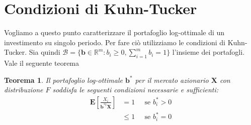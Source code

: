 \documentclass[a4paper,11pt]{book}
\theoremstyle{plain}
\newtheorem{teo}{Teorema}[chapter]
\theoremstyle{definition}
\theoremstyle{remark}
\newcommand{\R}{\mathbb{R}}
\newcommand{\X}{\bm{X}}
\newcommand{\B}{\bm{b}}
\begin{document}
\section{Condizioni di Kuhn-Tucker}
Vogliamo a questo punto caratterizzare il portafoglio log-ottimale di un investimento su singolo periodo. Per fare ciò utilizziamo le condizioni di Kuhn-Tucker. Sia quindi $\mathcal{B}=\{\B\in \R^m: b_i \geq 0, \sum_{i=1}^{m}{b_i} = 1\}$ l'insieme dei portafogli. Vale il seguente teorema
\begin{teo}
	Il portafoglio log-ottimale $\B^*$ per il mercato azionario $\X$ con distribuzione $F$ soddisfa le seguenti condizioni necessarie e sufficienti:
	\begin{equation*}
		\begin{split}
		\mathbf{E}\left[\frac{X_i}{\B^{*t}\X}\right] & = 1 \;\;\;\;\; \text{se } b_i^*>0\\
		& \leq 1 \;\;\;\;\; \text{se } b_i^*=0
		\end{split}
	\end{equation*}
\end{teo}
\end{document}
